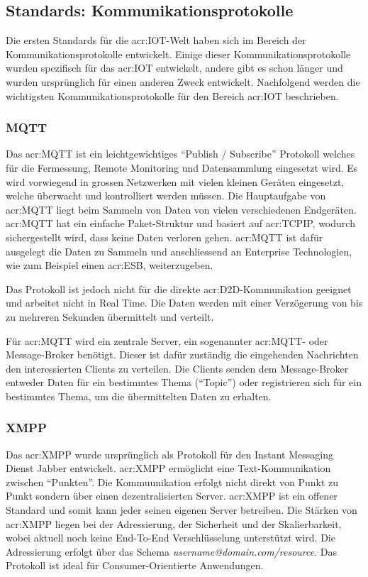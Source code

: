 \subsection{Standards: Kommunikationsprotokolle}
Die ersten Standards für die \gls{acr:IOT}-Welt haben sich im Bereich der Kommunikationsprotokolle entwickelt. Einige dieser Kommunikationsprotokolle wurden spezifisch für das \gls{acr:IOT} entwickelt, andere gibt es schon länger und wurden ursprünglich für einen anderen Zweck entwickelt. Nachfolgend werden die wichtigsten Kommunikationsprotokolle für den Bereich \gls{acr:IOT} beschrieben.


\subsubsection{MQTT}
Das \gls{acr:MQTT} ist ein leichtgewichtiges "`Publish / Subscribe"' Protokoll welches für die Fermessung, Remote Monitoring und Datensammlung eingesetzt wird. Es wird vorwiegend in grossen Netzwerken mit vielen kleinen Geräten eingesetzt, welche überwacht und kontrolliert werden müssen. Die Hauptaufgabe von \gls{acr:MQTT} liegt beim Sammeln von Daten von vielen verschiedenen Endgeräten. \gls{acr:MQTT} hat ein einfache Paket-Struktur und basiert auf \gls{acr:TCPIP}, wodurch sichergestellt wird, dass keine Daten verloren gehen. \gls{acr:MQTT} ist dafür ausgelegt die Daten zu Sammeln und anschliessend an Enterprise Technologien, wie zum Beispiel einen \gls{acr:ESB}, weiterzugeben.

Das Protokoll ist jedoch nicht für die direkte \gls{acr:D2D}-Kommunikation geeignet und arbeitet nicht in Real Time. Die Daten werden mit einer Verzögerung von bis zu mehreren Sekunden übermittelt und verteilt.

Für \gls{acr:MQTT} wird ein zentrale Server, ein sogenannter \gls{acr:MQTT}- oder Message-Broker benötigt. Dieser ist dafür zuständig die eingehenden Nachrichten den interessierten Clients zu verteilen. Die Clients senden dem Message-Broker entweder Daten für ein bestimmtes Thema ("`Topic"') oder registrieren sich für ein bestimmtes Thema, um die übermittelten Daten zu erhalten.



\subsubsection{XMPP}
Das \gls{acr:XMPP} wurde ursprünglich als Protokoll für den Instant Messaging Dienst Jabber entwickelt. \gls{acr:XMPP} ermöglicht eine Text-Kommunikation zwischen "`Punkten"'. Die Kommuunikation erfolgt nicht direkt von Punkt zu Punkt sondern über einen dezentralisierten Server. \gls{acr:XMPP} ist ein offener Standard und somit kann jeder seinen eigenen Server betreiben. Die Stärken von \gls{acr:XMPP} liegen bei der Adressierung, der Sicherheit und der Skalierbarkeit, wobei aktuell noch keine End-To-End Verschlüsselung unterstützt wird. Die Adressierung erfolgt über das Schema \textit{username@domain.com/resource}. Das Protokoll ist ideal für Consumer-Orientierte Anwendungen.

